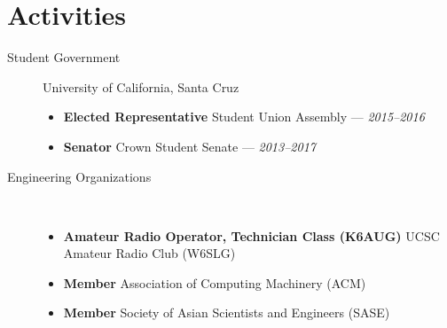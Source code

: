 \documentclass[10pt]{article}
\let\orighref\href
\renewcommand{\href}[2]{\orighref{#1}{#2{\scriptsize~\color{darkgray}\faExternalLink}}}
\begin{document}
\section*{Activities}
\begin{description}
  \item[Student Government] University of California, Santa Cruz
    \begin{itemize}
      \item \textbf{Elected Representative} Student Union Assembly --- \textit{2015--2016}
      \item \textbf{Senator} Crown Student Senate --- \textit{2013--2017}
    \end{itemize}
  \item[Engineering Organizations] ~
    \begin{itemize}
      \item \textbf{Amateur Radio Operator, Technician Class (K6AUG)} UCSC Amateur Radio Club (W6SLG)
      \item \textbf{Member} Association of Computing Machinery (ACM)
      \item \textbf{Member} Society of Asian Scientists and Engineers (SASE)
    \end{itemize}
\end{description}
\begin{comment}
\item[Volunteering] ~
  \begin{itemize}
    \item \textbf{Marketing Communications Chairperson}
      San Francisco Fil-Am Lions Club --- \textit{2015--present}
    \item \textbf{Attendee Safety Staff (Rovers Dept.)} FanimeCon, San Jose ---
      \textit{2013--present}
  \end{itemize}
\item[Relevant Hobbies] ~
  \begin{itemize}
    \item \textbf{\href{https://coord.info/PR62PFW}{Geocaching (4U6U57)}} 350
      finds
    \item \textbf{Pokemon Go} Team Instinct, Level 21
    \item \textbf{Ingress} Enlightened, Level 5
    \item \textbf{Google Maps Contributor/Local Guide} Level 5, formerly Google
      Maps Maker with 500+ edits
  \end{itemize}
\end{comment}
\end{document}
